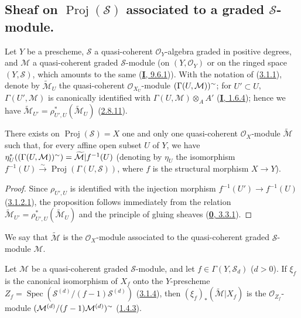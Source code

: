 \subsection{Sheaf on $\operatorname{Proj}(\mathcal{S})$ associated to a
graded $\mathcal{S}$-module.}
\label{subsection:II.3.2}

\begin{env}[3.2.1]
\label{II.3.2.1}
Let $Y$ be a prescheme, $\mathcal{S}$ a quasi-coherent $\mathcal{O}_Y$-algebra
graded in positive degrees, and $\mathcal{M}$ a quasi-coherent graded
$\mathcal{S}$-module (on $(Y,\mathcal{O}_Y)$ or on the ringed space
$(Y,\mathcal{S})$, which amounts to the same
(\hyperref[I.9.6.1]{\textbf{I}, 9.6.1})). With the notation of
(\hyperref[II.3.1.1]{3.1.1}), denote by $\widetilde{\mathcal{M}}_U$ the
quasi-coherent $\mathcal{O}_{X_U}$-module
$(\Gamma(U,\mathcal{M}))^{\sim}$; for $U'\subset U$,
$\Gamma(U',\mathcal{M})$ is canonically identified with
$\Gamma(U,\mathcal{M})\otimes_A A'$ (\hyperref[I.1.6.4]{\textbf{I}, 1.6.4}); hence
we have $\widetilde{\mathcal{M}}_{U'}
=\rho_{U',U}^*(\widetilde{\mathcal{M}}_U)$
(\hyperref[II.2.8.11]{2.8.11}).
\end{env}

\begin{proposition}[3.2.2]
\label{II.3.2.2}
There exists on $\operatorname{Proj}(\mathcal{S})=X$ one and only one
quasi-coherent $\mathcal{O}_X$-module $\widetilde{\mathcal{M}}$ such that,
for every affine open subset $U$ of $Y$, we have $\eta_U^*((\Gamma(U,\mathcal{M}))^{\sim})
=\widetilde{\mathcal{M}}|f^{-1}(U)$
(denoting by $\eta_U$ the isomorphism
$f^{-1}(U)\xrightarrow{\sim}\operatorname{Proj}(\Gamma(U,\mathcal{S}))$, where
$f$ is the structural morphism $X\to Y$).
\end{proposition}

\begin{proof}
Since $\rho_{U',U}$ is identified with the injection morphism
$f^{-1}(U')\to f^{-1}(U)$ (\hyperref[II.3.1.2.1]{3.1.2.1}), the
proposition follows immediately from the relation
$\widetilde{\mathcal{M}}_{U'}=\rho_{U',U}^*(\widetilde{\mathcal{M}}_U)$ and
the principle of gluing sheaves (\hyperref[0.3.3.1]{\textbf{0}, 3.3.1}).
\end{proof}

We say that $\widetilde{\mathcal{M}}$ is the $\mathcal{O}_X$-module associated
to the quasi-coherent graded $\mathcal{S}$-module $\mathcal{M}$.

\begin{proposition}[3.2.3]
\label{II.3.2.3}
Let $\mathcal{M}$ be a quasi-coherent graded $\mathcal{S}$-module, and let
$f\in\Gamma(Y,\mathcal{S}_d)$ ($d>0$). If $\xi_f$ is the canonical isomorphism
of $X_f$ onto the $Y$-prescheme
$Z_f=\operatorname{Spec}(\mathcal{S}^{(d)}/(f-1)\mathcal{S}^{(d)})$
\textup{(\hyperref[II.3.1.4]{3.1.4})}, then $(\xi_f)_*(\widetilde{\mathcal{M}}|X_f)$
is the $\mathcal{O}_{Z_f}$-module
$(\mathcal{M}^{(d)}/(f-1)\mathcal{M}^{(d)})^{\sim}$
\textup{(\hyperref[II.1.4.3]{1.4.3})}.
\end{proposition}

